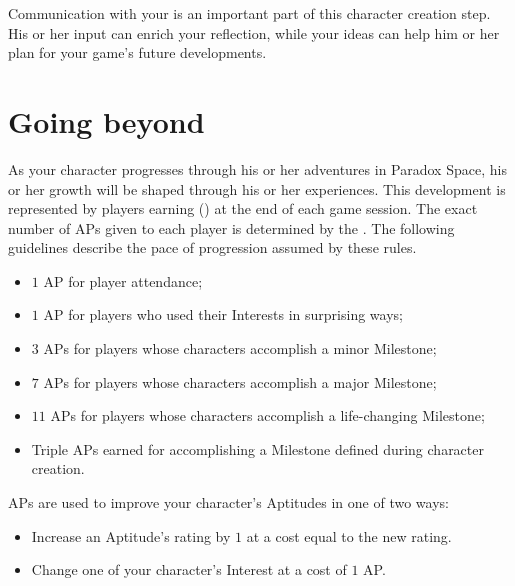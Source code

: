 Communication with your \GM{} is an important part of this character creation step. His or her input can enrich
your reflection, while your ideas can help him or her plan for your game's future developments.

\section{Going beyond}

As your character progresses through his or her adventures in Paradox Space, his or her growth will be shaped
through his or her experiences. This development is represented by players earning 
() at the end of each game session. The exact number of APs given to each player is determined by
the \GM. The following guidelines describe the pace of progression assumed by these rules.
\begin{itemize}
	\item $1$ AP for player attendance;
	\item $1$ AP for players who used their Interests in surprising ways;
	\item $3$ APs for players whose characters accomplish a minor Milestone;
	\item $7$ APs for players whose characters accomplish a major Milestone;
	\item $11$ APs for players whose characters accomplish a life-changing Milestone;
	\item Triple APs earned for accomplishing a Milestone defined during character creation.
\end{itemize}

APs are used to improve your character's Aptitudes in one of two ways:
\begin{itemize}
	\item Increase an Aptitude's rating by $1$ at a cost equal to the new rating.
	\item Change one of your character's Interest at a cost of $1$ AP.
\end{itemize}
